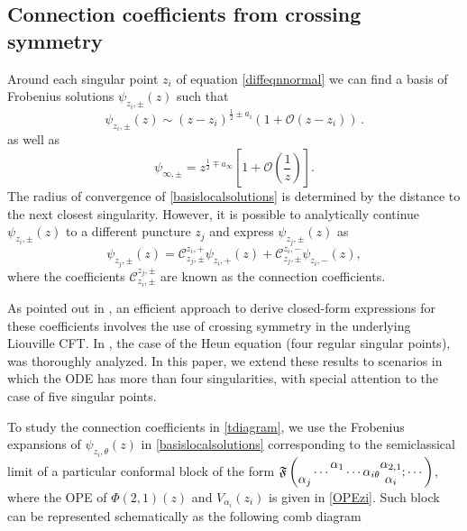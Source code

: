 \documentclass[11pt]{article}
\numberwithin{equation}{section}
\newcommand{\be}{\begin{equation}}
\newcommand{\ee}{\end{equation}}
\newcommand{\cC}{\ensuremath{\mathcal C}}
\begin{document}
\subsection{Connection coefficients from crossing symmetry}\label{sec:crossing}

Around each singular point $z_i$ of  equation \eqref{diffeqnnormal} we can find a basis of Frobenius solutions $ \psi_{z_i,\pm}(z)$ such that 
\begin{equation}\label{basislocalsolutions}
    \psi_{z_i,\pm}(z)\sim(z-z_i)^{\frac 1 2 \pm a_i}\left(1+\mathcal{O}\left(z-z_i\right)\right)\,.
\end{equation}
as well as
\begin{equation}
    \psi_{\infty,\pm}=z^{\frac{1}{2}\mp a_{\infty}}\left[1+\mathcal{O}\left(\frac{1}{z}\right)\right].
\end{equation}
The radius of convergence of \eqref{basislocalsolutions} is determined by the distance to the next closest singularity.
However, it is possible to analytically continue $\psi_{z_i,\pm}(z)$ to a different puncture $z_j$ and express $\psi_{z_j,\pm}(z)$  as
\be\label{tdiagram} \psi_{z_j,\pm}(z)=\cC^{z_i,+}_{z_j,\pm}\psi_{z_i,+}(z)+\cC^{z_i,-}_{z_j,\pm}\psi_{z_i,-}(z),\ee
where the coefficients $\cC^{z_j,\pm}_{z_i,\pm}$ are known as the connection coefficients. 

As pointed out in \cite{Bonelli:2022ten}, an efficient approach to derive closed-form expressions for these coefficients involves the use of crossing symmetry in the underlying Liouville CFT. In \cite{Bonelli:2022ten}, the case of the Heun equation (four regular singular points), was thoroughly analyzed. In this paper, we extend these results to scenarios in which the ODE has more than four singularities, with special attention to the case of five singular points.


To study the connection coefficients in \eqref{tdiagram}, we use the Frobenius expansions of $\psi_{z_i,\theta}(z)$ in \eqref{basislocalsolutions} corresponding to the semiclassical limit of a particular conformal block of the form 
$\mathfrak{F}\left(\begin{matrix}  \\ \alpha_{j} \end{matrix}\cdots \begin{matrix} \alpha_{1} \\ \hspace{0.1cm} \end{matrix}\cdots \alpha_{i\theta}\begin{matrix} \alpha_{2,1} \\ \alpha_{i} \end{matrix} ; \cdots\right)$, where the OPE of $\Phi(2,1)(z)$ and $V_{\alpha_i}(z_i)$ is given in \eqref{OPEzi}. 
Such block can be represented  schematically  as the following comb diagram
\end{document}
